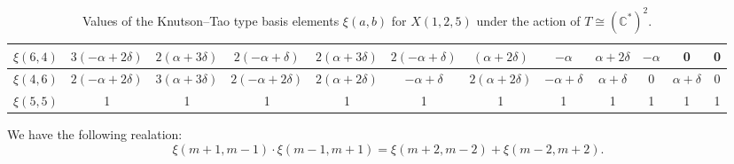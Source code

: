 \documentclass[10pt, a4paper, reqno]{amsart}
\begin{document}
\begin{exam}
\begin{table}[H]
{\begin{tabular}{|c|c|c|c|c|c|c|c|c|c|c|c|}
				$\xi(6,4)$&$3(-\alpha+2\delta)$&$2(\alpha+3\delta)$&$2(-\alpha+\delta)$ &$2(\alpha+3\delta)$&$2(-\alpha+\delta)$&$(\alpha+2\delta)$ &$-\alpha$ &$\alpha+2\delta$ &$-\alpha$ &0&0\\ \hline
				
				$\xi(4,6)$&$2(-\alpha+2\delta)$&$3(\alpha+3\delta)$&$2(-\alpha+2\delta)$ &$2(\alpha+2\delta)$ &$-\alpha+\delta$ &$2(\alpha+2\delta)$ &$-\alpha+\delta$ &$\alpha+\delta$ &0&$\alpha+\delta$ &0\\ \hline
				
				$\xi(5,5)$ &1&1&1&1&1&1&1&1&1&1&1\\ \hline
			\end{tabular}
		}
		\caption{Values of the Knutson--Tao type basis elements $\xi(a,b)$ for $X(1,2,5)$ under the action of $T\cong (\mathbb{C}^*)^2$.}
		\label{tab:KT_X125}
	\end{table}
\end{exam}
	

		\begin{propo}\label{mult:deg2deg2}
			We have the following realation:
		\begin{equation}\label{mult22}
		\xi(m+1,m-1)\cdot\xi(m-1,m+1)=	\xi(m+2,m-2)+\xi(m-2,m+2).
		\end{equation}
	\end{propo}
	
\end{document}
